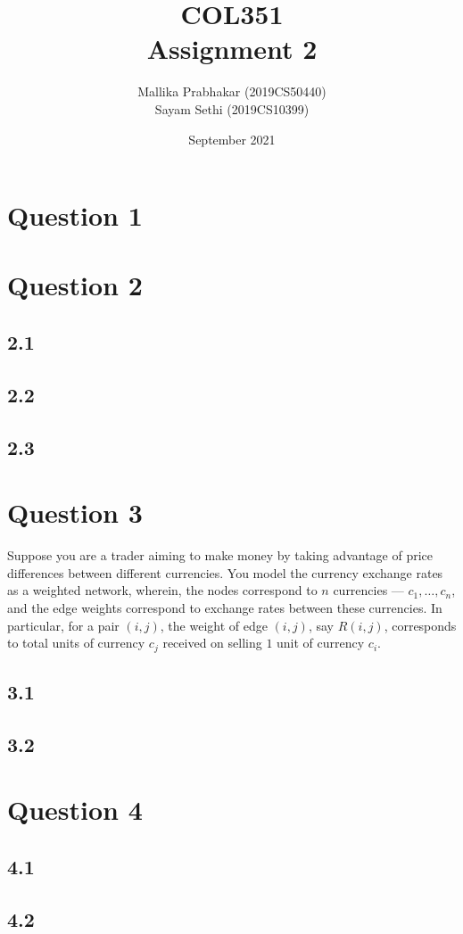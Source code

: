 \documentclass[11pt]{article}
\title{COL351\\Assignment 2}
\author{Mallika Prabhakar (2019CS50440)\\Sayam Sethi (2019CS10399)}
\date{September 2021}
\begin{document}
\maketitle

\tableofcontents


\newpage
\section{Question 1}



\newpage
\section{Question 2}

\subsection{2.1}


\subsection{2.2}


\subsection{2.3}



\newpage
\section{Question 3}
Suppose you are a trader aiming to make money by taking advantage of price differences between different currencies. You model the currency exchange rates as a weighted network, wherein, the nodes correspond to $n$ currencies --- $c_1, \ldots, c_n$, and the edge weights correspond to exchange rates between these currencies. In particular, for a pair $(i, j)$, the weight of edge $(i, j)$, say $R(i, j)$, corresponds to total units of currency $c_j$ received on selling $1$ unit of currency
$c_i$.

\subsection{3.1}


\subsection{3.2}



\newpage
\section{Question 4}

\subsection{4.1}


\subsection{4.2}

\end{document}
